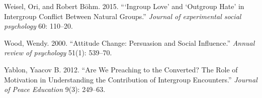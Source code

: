 \documentclass[11pt]{article}
\begin{document}
\leavevmode\hypertarget{ref-weisel2015ingroup}{}%
Weisel, Ori, and Robert Böhm. 2015. ```Ingroup Love' and `Outgroup Hate'
in Intergroup Conflict Between Natural Groups.'' \emph{Journal of
experimental social psychology} 60: 110--20.

\leavevmode\hypertarget{ref-wood2000attitude}{}%
Wood, Wendy. 2000. ``Attitude Change: Persuasion and Social Influence.''
\emph{Annual review of psychology} 51(1): 539--70.

\leavevmode\hypertarget{ref-yablon2012we}{}%
Yablon, Yaacov B. 2012. ``Are We Preaching to the Converted? The Role of
Motivation in Understanding the Contribution of Intergroup Encounters.''
\emph{Journal of Peace Education} 9(3): 249--63.
\end{document}
